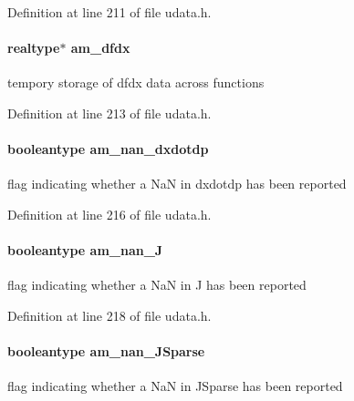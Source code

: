 Definition at line 211 of file udata.\+h.

\hypertarget{struct_user_data_add62c739ea5cc6d2a6be03eb2bbdfe95}{}
\paragraph[{am\+\_\+dfdx}]{\setlength{\rightskip}{0pt plus 5cm}realtype$\ast$ am\+\_\+dfdx}\label{struct_user_data_add62c739ea5cc6d2a6be03eb2bbdfe95}
tempory storage of dfdx data across functions 

Definition at line 213 of file udata.\+h.

\hypertarget{struct_user_data_a82073e35d78644037fb7570a4608d6de}{}
\paragraph[{am\+\_\+nan\+\_\+dxdotdp}]{\setlength{\rightskip}{0pt plus 5cm}booleantype am\+\_\+nan\+\_\+dxdotdp}\label{struct_user_data_a82073e35d78644037fb7570a4608d6de}
flag indicating whether a Na\+N in dxdotdp has been reported 

Definition at line 216 of file udata.\+h.

\hypertarget{struct_user_data_a9e2b4f94b4dbe949e636af5cabbd47cf}{}
\paragraph[{am\+\_\+nan\+\_\+\+J}]{\setlength{\rightskip}{0pt plus 5cm}booleantype am\+\_\+nan\+\_\+\+J}\label{struct_user_data_a9e2b4f94b4dbe949e636af5cabbd47cf}
flag indicating whether a Na\+N in J has been reported 

Definition at line 218 of file udata.\+h.

\hypertarget{struct_user_data_a56f3a28c756fe2ec27609fc7b6b8eba7}{}
\paragraph[{am\+\_\+nan\+\_\+\+J\+Sparse}]{\setlength{\rightskip}{0pt plus 5cm}booleantype am\+\_\+nan\+\_\+\+J\+Sparse}\label{struct_user_data_a56f3a28c756fe2ec27609fc7b6b8eba7}
flag indicating whether a Na\+N in J\+Sparse has been reported 

